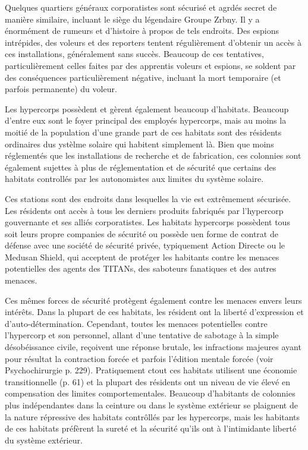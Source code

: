 Quelques quartiers généraux corporatistes sont sécurisé et agrdés secret de manière similaire, incluant le siège du légendaire Groupe Zrbny. Il y a énormément de rumeurs et d'histoire à propos de tels endroits. Des espions intrépides, des voleurs et des reporters tentent régulièrement d'obtenir un accès à ces installations, généralement sans succès. Beaucoup de ces tentatives, particulièrement celles faites par des apprentis voleurs et espions, se soldent par des conséquences particulièrement négative, incluant la mort temporaire (et parfois permanente) du voleur. 

Les hypercorps possèdent et gèrent également beaucoup d'habitats. Beaucoup d'entre eux sont le foyer principal des employés hypercorps, mais au moins la moitié de la population d'une grande part de ces habitats sont des résidents ordinaires dus ystèlme solaire qui habitent simplement là. Bien que moins réglementés que les installations de recherche et de fabrication, ces colonnies sont également sujettes à plus de réglementation et de sécurité que certains des habitats controllés par les autonomistes aux limites du système solaire. 

Ces stations sont des endroits dans lesquelles la vie est extrêmement sécurisée. Les résidents ont accès à tous les derniers produits fabriqués par l'hypercorp gouvernante et ses alliés corporatistes. Les habitats hypercorps possèdent tous soit leurs propre companies de sécurité ou possède uen forme de contrat de défense avec une société de sécurité privée, typiquement Action Directe ou le Medusan Shield, qui acceptent de protéger les habitants contre les menaces potentielles des agents des TITANs, des saboteurs fanatiques et des autres menaces. 

Ces mêmes forces de sécurité protègent également contre les menaces envers leurs intérêts. Dans la plupart de ces habitats, les résident ont la liberté d'expression et d'auto-détermination. Cependant, toutes les menaces potentielles contre l'hypercorp et son personnel, allant d'une tentative de sabotage à la simple désobéissance civile, reçoivent une réponse brutale, les infractions majeures ayant pour résultat la contraction forcée et parfois l'édition mentale forcée (voir Psychochirurgie p. 229). Pratiquement ctout ces habitats utilisent une économie transitionnelle (p. 61) et la plupart des résidents ont un niveau de vie élevé en compensation des limites comportementales. Beaucoup d'habitants de colonnies plus indépendantes dans la ceinture ou dans le système extérieur se plaignent de la nature répressive des habitats contrôllés par les hypercorps, mais les habitants de ces habitats préfèrent la sureté et la sécurité qu'ils ont à l'intimidante liberté du système extérieur. 

